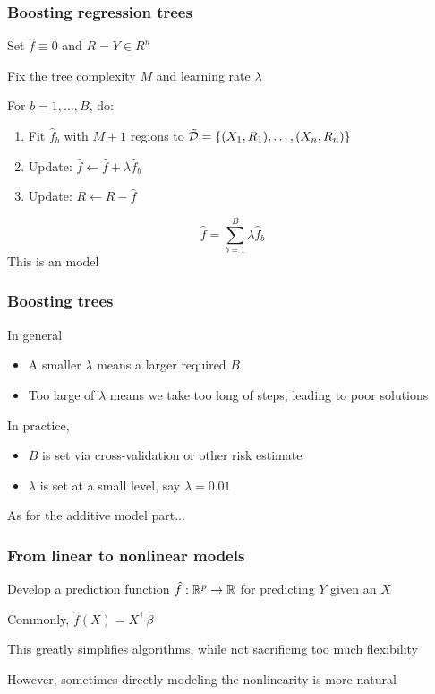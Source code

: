 \documentclass[12pt]{beamer}
\begin{document}
\begin{frame}[fragile]
\frametitle{Boosting regression trees}
Set $\hat f \equiv 0$ and $R = Y \in R^n$

\vsp
Fix the tree complexity $M$ and learning rate $\lambda$


\vsp
For $b = 1, \ldots, B$, do: 
\begin{enumerate}
\item Fit $\hat f_b$ with $M+1$ regions to $\tilde{\mathcal{D}} = \{ (X_1, R_1),\ldots,(X_n,R_n)\}$
\item Update: $\hat f \leftarrow \hat f + \lambda \hat{f}_b$
\item Update: $R \leftarrow R - \hat{f}$
\end{enumerate}
\[
\hat{f} = \sum_{b=1}^B \lambda \hat{f}_b
\]
This is an  model
\end{frame}

\begin{frame}[fragile]
\frametitle{Boosting trees}
In general
\begin{itemize}
\item A smaller $\lambda$ means a larger required $B$
\item Too large of $\lambda$ means we take too long of steps, leading to poor solutions

\end{itemize}
\vsp

In practice, 
\begin{itemize}
\item $B$ is set via cross-validation or other risk estimate

\item $\lambda$ is set at a small level, say $\lambda = 0.01$
\end{itemize}

\vsp
As for the additive model part...
\end{frame}

\begin{frame}[fragile]
\frametitle{From linear to nonlinear models}
 Develop a prediction function $\hat{f}: \mathbb{R}^p \rightarrow \mathbb{R}$
for predicting $Y$ given an $X$

\vsp
Commonly, $\hat{f}(X) = X^{\top}\beta$ 


\vsp
This greatly simplifies algorithms, while not sacrificing too much flexibility

\vsp
However, sometimes directly modeling the nonlinearity is more natural
\end{frame}
\end{document}
